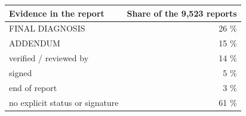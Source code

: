 \begin{tabular}{@{}lr@{}}
\toprule
Evidence in the report & Share of the 9,523 reports \\
\midrule
FINAL DIAGNOSIS & 26 \% \\
ADDENDUM & 15 \% \\
verified / reviewed by & 14 \% \\
signed & 5 \% \\
end of report & 3 \% \\
no explicit status or signature & 61 \% \\
\bottomrule
\end{tabular}
